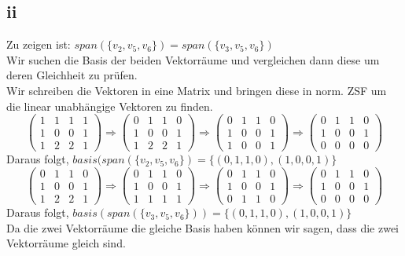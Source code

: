 \documentclass[10pt,a4paper]{article}
\begin{document}
 \subsection{ii}
 Zu zeigen ist: $span(\{v_2,v_5,v_6\}) = span(\{v_3,v_5,v_6\}) $\\
 Wir suchen die Basis der beiden Vektorräume und vergleichen dann diese um deren Gleichheit zu prüfen.\\
 Wir schreiben die Vektoren in eine Matrix und bringen diese in norm. ZSF um die linear unabhängige Vektoren zu finden.\\
 \begin{equation*}
 \begin{pmatrix}
 1&1&1&1 \\ 1&0&0&1 \\ 1&2&2&1
 \end{pmatrix} \Rightarrow
 \begin{pmatrix}
 0&1&1&0 \\ 1&0&0&1 \\ 1&2&2&1
 \end{pmatrix} \Rightarrow
 \begin{pmatrix}
 0&1&1&0 \\ 1&0&0&1 \\ 1&0&0&1
 \end{pmatrix} \Rightarrow
 \begin{pmatrix}
 0&1&1&0 \\ 1&0&0&1 \\ 0&0&0&0
 \end{pmatrix}
 \end{equation*}
 Daraus folgt, $basis( span(\{v_2,v_5,v_6\}) = \{(0,1,1,0),(1,0,0,1) \}$\\
 \begin{equation*}
 \begin{pmatrix}
   0&1&1&0 \\ 1&0&0&1 \\ 1&2&2&1
 \end{pmatrix} \Rightarrow
 \begin{pmatrix}
   0&1&1&0 \\ 1&0&0&1 \\ 1&1&1&1
 \end{pmatrix} \Rightarrow
 \begin{pmatrix}
   0&1&1&0 \\ 1&0&0&1 \\ 0&1&1&0
 \end{pmatrix} \Rightarrow
 \begin{pmatrix}
   0&1&1&0 \\ 1&0&0&1 \\ 0&0&0&0
 \end{pmatrix} 
 \end{equation*}
 Daraus folgt, $basis(span(\{v_3,v_5,v_6\})) = \{(0,1,1,0),(1,0,0,1) \}$\\
 Da die zwei Vektorräume die gleiche Basis haben können wir sagen, dass die zwei Vektorräume gleich sind.
\end{document}
